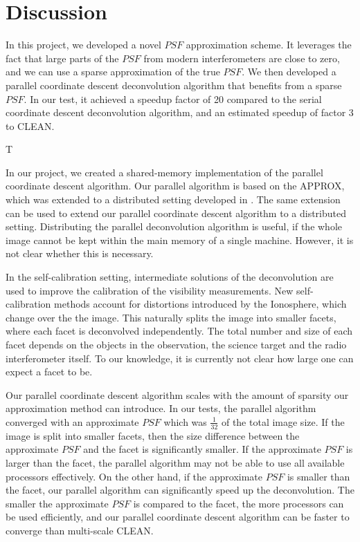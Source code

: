 \section{Discussion}\label{discussion}
In this project, we developed a novel $PSF$ approximation scheme. It leverages the fact that large parts of the $PSF$ from modern interferometers are close to zero, and we can use a sparse approximation of the true $PSF$. We then developed a parallel coordinate descent deconvolution algorithm that benefits from a sparse $PSF$. In our test, it achieved a speedup factor of 20 compared to the serial coordinate descent deconvolution algorithm, and an estimated speedup of factor 3 to CLEAN.

T

In our project, we created a shared-memory implementation of the parallel coordinate descent algorithm. Our parallel algorithm is based on the APPROX\cite{fercoq2015accelerated}, which was extended to a distributed setting developed in \cite{fercoqfast}. The same extension can be used to extend our parallel coordinate descent algorithm to a distributed setting. Distributing the parallel deconvolution algorithm is useful, if the whole image cannot be kept within the main memory of a single machine. However, it is not clear whether this is necessary.

In the self-calibration setting, intermediate solutions of the deconvolution are used to improve the calibration of the visibility measurements. New self-calibration methods account for distortions introduced by the Ionosphere, which change over the the image. This naturally splits the image into smaller facets, where each facet is deconvolved independently\cite{van2016lofar}. The total number and size of each facet depends on the objects in the observation, the science target and the radio interferometer itself. To our knowledge, it is currently not clear how large one can expect a facet to be.

Our parallel coordinate descent algorithm scales with the amount of sparsity our approximation method can introduce. In our tests, the parallel algorithm converged with an approximate $PSF$ which was $\frac{1}{32}$ of the total image size. If the image is split into smaller facets, then the size difference between the approximate $PSF$ and the facet is significantly smaller. If the approximate $PSF$ is larger than the facet, the parallel algorithm may not be able to use all available processors effectively. On the other hand, if the approximate $PSF$ is smaller than the facet, our parallel algorithm can significantly speed up the deconvolution. The smaller the approximate $PSF$ is compared to the facet, the more processors can be used efficiently, and our parallel coordinate descent algorithm can be faster to converge than multi-scale CLEAN.

